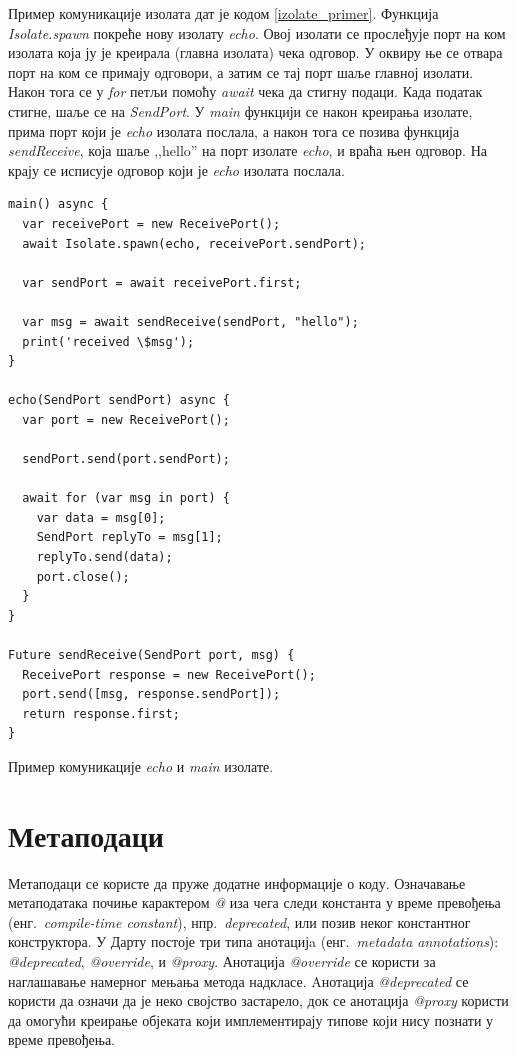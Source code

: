 \documentclass[12pt,oneside]{memoir}
\begin{document}
Пример комуникације изолата дат је кодом \ref{izolate_primer}. Функција \textit{Isolate.spawn} покреће нову изолату \textit{echo}. Овој изолати се прослеђује порт на ком изолата која ју је креирала (главна изолата) чека одговор. У оквиру ње се отвара порт на ком се примају одговори, а затим се тај порт шаље главној изолати. Након тога се у \textit{for} петљи помоћу \textit{await} чека да стигну подаци. Када податак стигне, шаље се на \textit{SendPort}. У \textit{main} функцији се након креирања изолате, прима порт који је \textit{echo} изолата послала, а након тога се позива функција \textit{sendReceive}, која шаље ,,hello'' на порт изолате \textit{echo}, и враћа њен одговор. На крају се исписује одговор који је \textit{echo} изолата послала.

\begin{listing}
\begin{verbatim}
main() async {
  var receivePort = new ReceivePort();
  await Isolate.spawn(echo, receivePort.sendPort);

  var sendPort = await receivePort.first;

  var msg = await sendReceive(sendPort, "hello");
  print('received \$msg');
}

echo(SendPort sendPort) async {
  var port = new ReceivePort();

  sendPort.send(port.sendPort);

  await for (var msg in port) {
    var data = msg[0];
    SendPort replyTo = msg[1];
    replyTo.send(data);
    port.close();
  }
}

Future sendReceive(SendPort port, msg) {
  ReceivePort response = new ReceivePort();
  port.send([msg, response.sendPort]);
  return response.first;
}
\end{verbatim}
\caption{Пример комуникације \textit{echo} и \textit{main} изолате.}
\label{izolate_primer}
\end{listing}

\section{Метаподаци}
\label{metapodaci}
Метаподаци се користе да пруже додатне информације о коду. Означавање метаподатака почиње карактером \textit{@} иза чега следи константа у време превођења (енг.~\textit{compile-time constant}), нпр.~\textit{deprecated}, или позив неког константног конструктора. 
У Дарту постоје три типа анотацијa (енг.~\textit{metadata annotations}): \textit{@deprecated}, \textit{@override}, и \textit{@proxy}.
Анотација \textit{@override} се користи за наглашавање намерног мењања метода надкласе. Aнотација \textit{@deprecated} се користи да означи да је неко својство застарело, док се анотација \textit{@proxy} користи да омогући креирање објеката који имплементирају типове који нису познати у време превођења.
\end{document}
